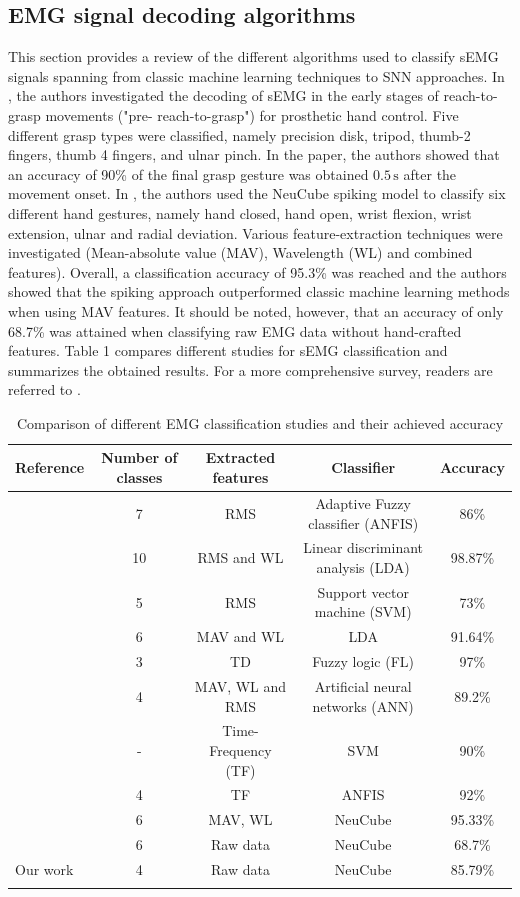 \documentclass[journal,article,submit,moreauthors,pdftex,10pt,a4paper]{Definitions/mdpi}
\begin{document}
\subsection{EMG signal decoding algorithms}
This section provides a review of the different algorithms used to classify sEMG signals spanning from classic machine learning techniques to SNN approaches. In \cite{8}, the authors investigated the decoding of sEMG in the early stages of reach-to-grasp movements ("pre- reach-to-grasp") for prosthetic hand control. Five different grasp types were classified, namely precision disk, tripod, thumb-2 fingers, thumb 4 fingers, and ulnar pinch. In the paper, the authors showed that an accuracy of 90\% of the final grasp gesture was obtained $0.5\,\text{s}$ after the movement onset. In \cite{9}, the authors used the NeuCube spiking model to classify six different hand gestures, namely hand closed, hand open, wrist flexion, wrist extension, ulnar and radial deviation. Various feature-extraction techniques were investigated (Mean-absolute value (MAV), Wavelength (WL) and combined features). Overall, a classification accuracy of 95.3\% was reached and the authors showed that the spiking approach outperformed classic machine learning methods when using MAV features. It should be noted, however, that an accuracy of only 68.7\% was attained when classifying raw EMG data without hand-crafted features. Table 1 compares different studies for sEMG classification and summarizes the obtained results. For a more comprehensive survey, readers are referred to \cite{10}. 
\begin{table}[ht]
\caption{Comparison of different EMG classification studies and their achieved accuracy}
\label{table}
	\centering
	\small
	\begin{tabular}{lcccc}
	
		\textbf{Reference  } 	&\textbf{Number of classes}  &\textbf{Extracted features} &\textbf{Classifier} &\textbf{Accuracy} \\ 
		\hline\hline \cite{11} &7 &RMS & Adaptive Fuzzy classifier (ANFIS) &86\% \\
		\hline \cite{12} &10 &RMS and WL &Linear discriminant analysis (LDA)&98.87\% \\
		\hline \cite{13}  &5& RMS & Support vector machine (SVM)& 73\% \\
		\hline \cite{14}  &6&MAV and WL &LDA&91.64\% \\
		\hline \cite{15} & 3& TD&Fuzzy logic (FL) &97\%\\
		\hline \cite{16} &4& MAV, WL and RMS& Artificial neural networks (ANN)&89.2\%\\	
		\hline \cite{17} &-& Time-Frequency (TF)& SVM&90\%\\
		\hline \cite{18} &4& TF& ANFIS &92\%\\
		\hline \cite{9} &6& MAV, WL& NeuCube &95.33\%\\
		\hline \cite{9} &6& Raw data& NeuCube &68.7\%\\
		\hline Our work &4& Raw data& NeuCube &85.79\%\\
		\hline& & & &
	\end{tabular} 
\end{table}
%
\end{document}
